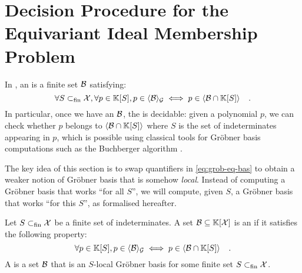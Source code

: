 \section{Decision Procedure for the Equivariant Ideal Membership Problem}
\label{sec:algorithm}


In \cite{GHOLAS24}, an  
is a finite set $\Basis$
satisfying:
\begin{equation}
    \label{eq:grob-eq-bas}
    \forall S \subfin \X, 
    \forall p \in \poly{\K}{S},
    p \in \gen{\Basis}{\group}
    \iff
    p \in \gen{\Basis \cap \poly{\K}{S}}
        \quad .
\end{equation}
In particular, once we have an  $\Basis$,
the  is decidable: given a polynomial
$p$, we can check whether $p$ belongs to $\gen{\Basis \cap \poly{\K}{S}}{}$
where $S$ is the set of indeterminates appearing in $p$, which is possible
using classical tools for Gröbner basis computations such as 
the Buchberger algorithm \cite{BUCH76}.

The key idea of this section is to swap quantifiers in \cref{eq:grob-eq-bas}
to obtain a weaker notion of Gröbner basis that is somehow
\emph{local}.  Instead of computing a Gröbner basis that works
``for all $S$'', we will compute, given $S$, a
Gröbner basis that works ``for this $S$'', as formalised hereafter.
\begin{definition}
    \label{def:weak-grob}
    Let $S \subset_{\text{fin}} \mathcal{X}$ be a finite set of indeterminates.
    A set $\Basis \subseteq \poly{\K}{\X}$ is an 
    if it satisfies the following property:
    \begin{equation}
        \label{eq:weak-grob}
        \forall p \in \poly{\K}{S},
        p \in \gen{\Basis}{\group}
        \iff
        p \in \gen{\Basis \cap \poly{\K}{S}}
        \quad .
    \end{equation}
    A  
    is a set $\Basis$ that is an $S$-local Gröbner basis
    for some finite set $S \subset_{\text{fin}} \mathcal{X}$.
\end{definition}


